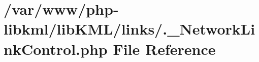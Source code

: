 \hypertarget{_8__NetworkLinkControl_8php}{
\section{/var/www/php-\/libkml/libKML/links/.\_\-NetworkLinkControl.php File Reference}
\label{dd/d84/_8__NetworkLinkControl_8php}
}
